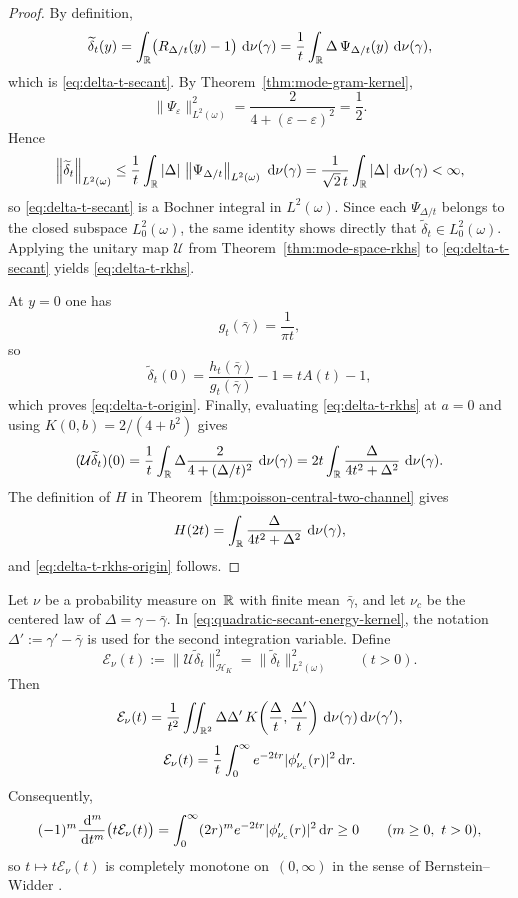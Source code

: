 \begin{proof}
By definition,
\[
\widetilde\delta_t(y)
=\int_{\mathbb{R}}\bigl(R_{\Delta/t}(y)-1\bigr)\,\,\mathrm{d}\nu(\gamma)
=\frac{1}{t}\int_{\mathbb{R}}\Delta\,\Psi_{\Delta/t}(y)\,\,\mathrm{d}\nu(\gamma),
\]
which is \eqref{eq:delta-t-secant}.  By Theorem~\ref{thm:mode-gram-kernel},
\[
\|\Psi_\varepsilon\|_{L^2(\omega)}^2
=\frac{2}{4+(\varepsilon-\varepsilon)^2}
=\frac12.
\]
Hence
\[
\left\|\widetilde\delta_t\right\|_{L^2(\omega)}
\le\frac{1}{t}\int_{\mathbb{R}}|\Delta|\,\left\|\Psi_{\Delta/t}\right\|_{L^2(\omega)}\,\,\mathrm{d}\nu(\gamma)
=\frac{1}{\sqrt2\,t}\int_{\mathbb{R}}|\Delta|\,\,\mathrm{d}\nu(\gamma)
<\infty,
\]
so \eqref{eq:delta-t-secant} is a Bochner integral in $L^2(\omega)$.
Since each $\Psi_{\Delta/t}$ belongs to the closed subspace
$L^2_0(\omega)$, the same identity shows directly that
$\widetilde\delta_t\in L^2_0(\omega)$.  Applying the unitary map
$\mathcal U$ from Theorem~\ref{thm:mode-space-rkhs} to
\eqref{eq:delta-t-secant} yields \eqref{eq:delta-t-rkhs}.

At $y=0$ one has
\[
g_t(\bar\gamma)=\frac{1}{\pi t},
\]
so
\[
\widetilde\delta_t(0)
=\frac{h_t(\bar\gamma)}{g_t(\bar\gamma)}-1
=tA(t)-1,
\]
which proves \eqref{eq:delta-t-origin}.  Finally, evaluating
\eqref{eq:delta-t-rkhs} at $a=0$ and using
$K(0,b)=2/(4+b^2)$ gives
\[
(\mathcal U\widetilde\delta_t)(0)
=\frac{1}{t}\int_{\mathbb{R}}\Delta\frac{2}{4+(\Delta/t)^2}\,\,\mathrm{d}\nu(\gamma)
=2t\int_{\mathbb{R}}\frac{\Delta}{4t^2+\Delta^2}\,\,\mathrm{d}\nu(\gamma).
\]
The definition of $H$ in
Theorem~\ref{thm:poisson-central-two-channel} gives
\[
H(2t)=\int_{\mathbb{R}}\frac{\Delta}{4t^2+\Delta^2}\,\,\mathrm{d}\nu(\gamma),
\]
and \eqref{eq:delta-t-rkhs-origin} follows.
\end{proof}

\begin{corollary}
\label{cor:quadratic-secant-energy}
Let $\nu$ be a probability measure on~$\mathbb{R}$ with finite mean~$\bar\gamma$,
and let $\nu_c$ be the centered law of $\Delta=\gamma-\bar\gamma$.
In \eqref{eq:quadratic-secant-energy-kernel}, the notation
$\Delta':=\gamma'-\bar\gamma$ is used for the second integration
variable.
Define
\[
\mathcal E_\nu(t)
:=
\|\mathcal U\widetilde\delta_t\|_{\mathcal H_K}^2
=
\|\widetilde\delta_t\|_{L^2(\omega)}^2
\qquad(t>0).
\]
Then
\begin{equation}\label{eq:quadratic-secant-energy-kernel}
\mathcal E_\nu(t)
=
\frac{1}{t^2}
\iint_{\mathbb{R}^2}\Delta\Delta'\,
K\!\left(\frac{\Delta}{t},\frac{\Delta'}{t}\right)
\,\mathrm{d}\nu(\gamma)\,\mathrm{d}\nu(\gamma'),
\end{equation}
\begin{equation}\label{eq:quadratic-secant-energy-laplace}
\mathcal E_\nu(t)
=
\frac{1}{t}\int_0^\infty e^{-2tr}
\lvert \phi_{\nu_c}'(r)\rvert^2\,\mathrm{d} r.
\end{equation}
Consequently,
\begin{equation}\label{eq:quadratic-secant-energy-complete-monotone}
(-1)^m\frac{\,\mathrm{d}^m}{\,\mathrm{d} t^m}\bigl(t\mathcal E_\nu(t)\bigr)
=
\int_0^\infty (2r)^m e^{-2tr}
\lvert \phi_{\nu_c}'(r)\rvert^2\,\mathrm{d} r
\ge 0
\qquad(m\ge 0,\ t>0),
\end{equation}
so $t\mapsto t\mathcal E_\nu(t)$ is completely monotone on~$(0,\infty)$
in the sense of Bernstein--Widder \cite{Widder1941}.
\end{corollary}

